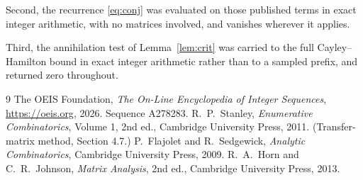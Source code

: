\documentclass[11pt,a4paper]{article}
\theoremstyle{plain}
\theoremstyle{definition}
\begin{document}
Second, the recurrence \eqref{eq:conj} was evaluated on those published terms in exact
integer arithmetic, with no matrices involved, and vanishes wherever it applies.

Third, the annihilation test of Lemma~\ref{lem:crit} was carried to the full
Cayley--Hamilton bound in exact integer arithmetic rather than to a sampled prefix, and
returned zero throughout.

\begin{thebibliography}{9}
 The OEIS Foundation, \emph{The On-Line Encyclopedia of Integer
Sequences}, \url{https://oeis.org}, 2026. Sequence A278283.
 R.~P.~Stanley, \emph{Enumerative Combinatorics}, Volume 1, 2nd ed.,
Cambridge University Press, 2011. (Transfer-matrix method, Section 4.7.)
 P.~Flajolet and R.~Sedgewick, \emph{Analytic Combinatorics}, Cambridge
University Press, 2009.
 R.~A.~Horn and C.~R.~Johnson, \emph{Matrix Analysis}, 2nd ed., Cambridge
University Press, 2013.
\end{thebibliography}
\end{document}
